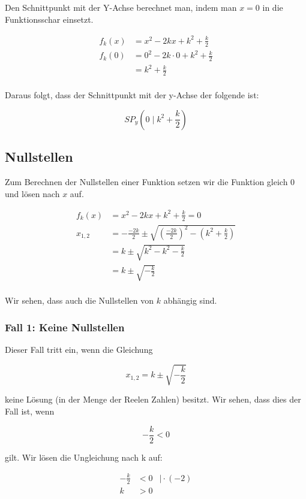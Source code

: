 \documentclass[12pt,a4paper]{article}
\begin{document}
Den Schnittpunkt mit der Y-Achse berechnet man, indem man $x=0$ in die Funktionsschar einsetzt. 

$$
\begin{aligned}
    f_k(x)&= x^2 - 2kx + k^2 + \frac{k}{2} \\
    f_k(0)&= 0^2 - 2k \cdot 0 + k^2 + \frac{k}{2} \\
    &= k^2 + \frac{k}{2} \\
\end{aligned}
$$

Daraus folgt, dass der Schnittpunkt mit der y-Achse der folgende ist:

$$
\label{eq:spy}
SP_y(0 \mid k^2 + \frac{k}{2})
$$

\subsection {Nullstellen}

Zum Berechnen der Nullstellen einer Funktion setzen wir die Funktion gleich 0 und lösen nach $x$ auf.

$$
\begin{aligned}
    f_k(x)&= x^2 - 2kx + k^2 + \frac{k}{2} = 0 \\
    x_{1,2} &= -\frac{-2k}{2} \pm \sqrt{(\frac{-2k}{2})^2 - (k^2 + \frac{k}{2})} \\
    &= k \pm \sqrt{k^2 - k^2 - \frac{k}{2}} \\
    &= k \pm \sqrt{- \frac{k}{2}} \\
\end{aligned}
$$

Wir sehen, dass auch die Nullstellen von $k$ abhängig sind.

\subsubsection{Fall 1: Keine Nullstellen}

Dieser Fall tritt ein, wenn die Gleichung 

$$ x_{1,2} = k \pm \sqrt {-\frac{k}{2}} $$

keine Lösung (in der Menge der Reelen Zahlen) besitzt. Wir sehen, dass dies der Fall ist, wenn

$$ -\frac{k}{2} < 0 $$

gilt. Wir lösen die Ungleichung nach k auf:

$$ 
\begin{aligned}
    -\frac k 2 & < 0 & \mid \cdot (-2) \\
    k & > 0 
\end{aligned}
$$
\end{document}
